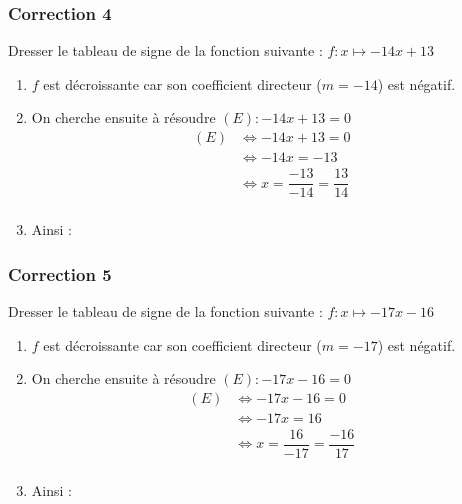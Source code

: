 \documentclass[15pt, mathserif]{beamer}
\begin{document}
\begin{frame}
\vspace{-10mm}
	\frametitle{Correction 4}
\vspace*{1cm} 
 \footnotesize{Dresser le tableau de signe de la fonction suivante : $ f:x\mapsto-14x+13$} 
 \begin{enumerate} 
 \item $f$ est décroissante car son coefficient directeur ($m=-14$) est négatif.
 \item On cherche ensuite à résoudre  $(E) : -14x+13=0 $	 
 \begin{align*} (E)& \Leftrightarrow -14x+13=0\\
		 	 & \Leftrightarrow -14x=-13\\
			 & \Leftrightarrow x= \dfrac{-13}{-14}=\dfrac{13}{14}\\
	 \end{align*} 
 \item Ainsi : \\ 
 \end{enumerate} 
 \end{frame}


\begin{frame}
\vspace{-10mm}
	\frametitle{Correction 5}
\vspace*{1cm} 
 \footnotesize{Dresser le tableau de signe de la fonction suivante : $ f:x\mapsto-17x-16$} 
 \begin{enumerate} 
 \item $f$ est décroissante car son coefficient directeur ($m=-17$) est négatif.
 \item On cherche ensuite à résoudre  $(E) : -17x-16=0 $	 
 \begin{align*} (E)& \Leftrightarrow -17x-16=0\\
		 	 & \Leftrightarrow -17x=16\\
			 & \Leftrightarrow x= \dfrac{16}{-17}=\dfrac{-16}{17}\\
	 \end{align*} 
 \item Ainsi : \\ 
 \end{enumerate} 
 \end{frame}
\end{document}
